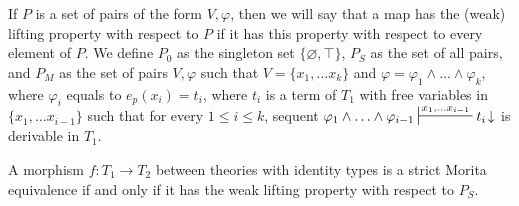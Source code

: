 \documentclass[reqno]{amsart}
\theoremstyle{definition}
\theoremstyle{remark}
\numberwithin{figure}{section}
\begin{document}
If $P$ is a set of pairs of the form $V,\varphi$, then we will say that a map has the (weak) lifting property with respect to $P$ if it has this property with respect to every element of $P$.
We define $P_0$ as the singleton set $\{ \varnothing,\top \}$, $P_S$ as the set of all pairs, and $P_M$ as the set of pairs $V,\varphi$ such that $V = \{ x_1, \ldots x_k \}$
and $\varphi = \varphi_1 \land \ldots \land \varphi_k$, where $\varphi_i$ equals to $e_p(x_i) = t_i$,
where $t_i$ is a term of $T_1$ with free variables in $\{ x_1, \ldots x_{i-1} \}$ such that for every $1 \leq i \leq k$,
sequent $\varphi_1 \land \ldots \land \varphi_{i-1} \sststile{}{x_1, \ldots x_{i-1}} t_i\!\downarrow$ is derivable in $T_1$.

\begin{prop}
A morphism $f : T_1 \to T_2$ between theories with identity types is a strict Morita equivalence if and only if it has the weak lifting property with respect to $P_S$.
\end{prop}
\end{document}
